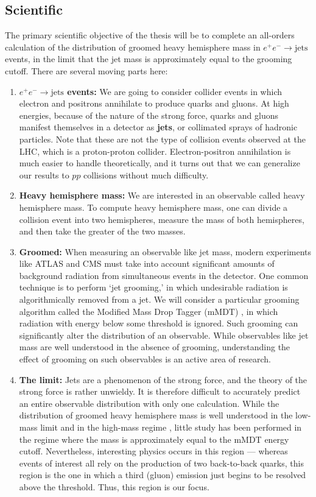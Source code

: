 \documentclass[../thesis.tex]{subfiles}
\begin{document}
\subsection{Scientific}
	The primary scientific objective of the thesis will be to complete an all-orders calculation of the distribution of groomed heavy hemisphere mass in $e^+ e^- \to \text{jets}$ events, in the limit that the jet mass is approximately equal to the grooming cutoff. There are several moving parts here:
	\begin{enumerate}
		\item \textbf{$e^+ e^- \to \text{jets}$ events:} We are going to consider collider events in which electron and positrons annihilate to produce quarks and gluons. At high energies, because of the nature of the strong force, quarks and gluons manifest themselves in a detector as \textbf{jets}, or collimated sprays of hadronic particles. Note that these are not the type of collision events observed at the LHC, which is a proton-proton collider. Electron-positron annihilation is much easier to handle theoretically, and it turns out that we can generalize our results to $pp$ collisions without much difficulty.

		\item \textbf{Heavy hemisphere mass:} We are interested in an observable called heavy hemisphere mass. To compute heavy hemisphere mass, one can divide a collision event into two hemispheres, measure the mass of both hemispheres, and then take the greater of the two masses.

		\item \textbf{Groomed:} When measuring an observable like jet mass, modern experiments like ATLAS and CMS must take into account significant amounts of background radiation from simultaneous events in the detector. One common technique is to perform `jet grooming,' in which undesirable radiation is algorithmically removed from a jet. We will consider a particular grooming algorithm called the Modified Mass Drop Tagger (mMDT) \cite{dasgupta_towards_2013}, in which radiation with energy below some threshold is ignored. Such grooming can significantly alter the distribution of an observable. While observables like jet mass are well understood in the absence of grooming, understanding the effect of grooming on such observables is an active area of research.

		\item \textbf{The limit:} Jets are a phenomenon of the strong force, and the theory of the strong force is rather unwieldy. It is therefore difficult to accurately predict an entire observable distribution with only one calculation. While the distribution of groomed heavy hemisphere mass is well understood in the low-mass limit \cite{kardos_groomed_2020,kardos_two-_2020,frye_factorization_2016} and in the high-mass regime \cite{kardos_soft-drop_2018}, little study has been performed in the regime where the mass is approximately equal to the mMDT energy cutoff. Nevertheless, interesting physics occurs in this region --- whereas events of interest all rely on the production of two back-to-back quarks, this region is the one in which a third (gluon) emission just begins to be resolved above the threshold. Thus, this region is our focus.


\end{enumerate}
\end{document}
